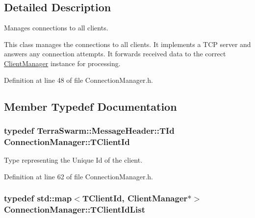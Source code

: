 \subsection{Detailed Description}
Manages connections to all clients. 

This class manages the connections to all clients. It implements a T\-C\-P server and answers any connection attempts. It forwards received data to the correct \hyperlink{class_client_manager}{Client\-Manager} instance for processing. 

Definition at line 48 of file Connection\-Manager.\-h.



\subsection{Member Typedef Documentation}
\hypertarget{class_connection_manager_a0c3634c02b95af84a477b253fcf2b29a}{
\subsubsection[{T\-Client\-Id}]{\setlength{\rightskip}{0pt plus 5cm}typedef {\bf Terra\-Swarm\-::\-Message\-Header\-::\-T\-Id} {\bf Connection\-Manager\-::\-T\-Client\-Id}\hspace{0.3cm}{\ttfamily [private]}}}\label{class_connection_manager_a0c3634c02b95af84a477b253fcf2b29a}


Type representing the Unique Id of the client. 



Definition at line 62 of file Connection\-Manager.\-h.

\hypertarget{class_connection_manager_a78c371deff0ac4add801b3c64216a467}{
\subsubsection[{T\-Client\-Id\-List}]{\setlength{\rightskip}{0pt plus 5cm}typedef std\-::map$<${\bf T\-Client\-Id}, {\bf Client\-Manager}$\ast$$>$ {\bf Connection\-Manager\-::\-T\-Client\-Id\-List}\hspace{0.3cm}{\ttfamily [private]}}}\label{class_connection_manager_a78c371deff0ac4add801b3c64216a467}


